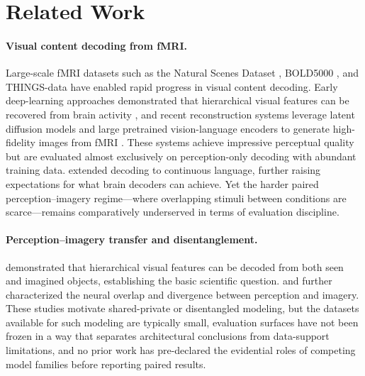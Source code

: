 \documentclass{article}
\begin{document}
\section{Related Work}

\paragraph{Visual content decoding from fMRI.}
Large-scale fMRI datasets such as the Natural Scenes Dataset
\citep{allen2022nsd}, BOLD5000 \citep{chang2019bold5000}, and THINGS-data
\citep{hebart2023things} have enabled rapid progress in visual content decoding.
Early deep-learning approaches demonstrated that hierarchical visual features
can be recovered from brain activity \citep{shen2019deep}, and recent
reconstruction systems leverage latent diffusion models and large pretrained
vision-language encoders to generate high-fidelity images from fMRI
\citep{takagi2023high,ozcelik2023brain,scotti2024mindeye2}.  These systems
achieve impressive perceptual quality but are evaluated almost exclusively on
perception-only decoding with abundant training data.
\citet{tang2023semantic} extended decoding to continuous language, further
raising expectations for what brain decoders can achieve.  Yet the harder paired
perception--imagery regime---where overlapping stimuli between conditions are
scarce---remains comparatively underserved in terms of evaluation discipline.

\paragraph{Perception--imagery transfer and disentanglement.}
\citet{horikawa2017generic} demonstrated that hierarchical visual features can
be decoded from both seen and imagined objects, establishing the basic
scientific question.  \citet{pearson2019imagery} and \citet{dijkstra2018temporal}
further characterized the neural overlap and divergence between perception and
imagery.  These studies motivate shared-private or disentangled modeling, but
the datasets available for such modeling are typically small, evaluation
surfaces have not been frozen in a way that separates architectural conclusions
from data-support limitations, and no prior work has pre-declared the
evidential roles of competing model families before reporting paired results.
\end{document}
